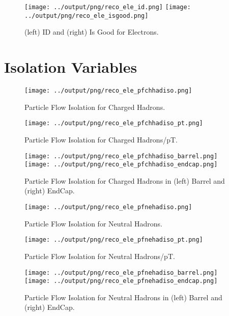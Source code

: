\documentclass[11pt]{book}
\begin{document}
\begin{figure}[htb]
\centering
\texttt{[image: ../output/png/reco\_ele\_id.png]}
\texttt{[image: ../output/png/reco\_ele\_isgood.png]}
\caption{(left) ID and (right) Is Good for Electrons.}
\label{fig:reco_ele_id_isgood}
\end{figure}
\clearpage

\section{Isolation Variables}
\begin{figure}[htb]
\centering
\texttt{[image: ../output/png/reco\_ele\_pfchhadiso.png]}
\caption{Particle Flow Isolation for Charged Hadrons.}
\label{fig:reco_ele_pfchhadiso}
\end{figure}

\begin{figure}[htb]
\centering
\texttt{[image: ../output/png/reco\_ele\_pfchhadiso\_pt.png]}
\caption{Particle Flow Isolation for Charged Hadrons/pT.}
\label{fig:reco_ele_pfchhadiso_pt}
\end{figure}

\begin{figure}[ht]
\centering
\texttt{[image: ../output/png/reco\_ele\_pfchhadiso\_barrel.png]}
\texttt{[image: ../output/png/reco\_ele\_pfchhadiso\_endcap.png]}
\caption{Particle Flow Isolation for Charged Hadrons in (left) Barrel and (right) EndCap.}
\label{fig:reco_ele_pfchhadiso_regions}
\end{figure}

\begin{figure}[ht]
\centering
\texttt{[image: ../output/png/reco\_ele\_pfnehadiso.png]}
\caption{Particle Flow Isolation for Neutral Hadrons.}
\label{fig:reco_ele_pfnehadiso}
\end{figure}

\begin{figure}[htb]
\centering
\texttt{[image: ../output/png/reco\_ele\_pfnehadiso\_pt.png]}
\caption{Particle Flow Isolation for Neutral Hadrons/pT.}
\label{fig:reco_ele_pfnehadiso_pt}
\end{figure}


\begin{figure}[ht]
\centering
\texttt{[image: ../output/png/reco\_ele\_pfnehadiso\_barrel.png]}
\texttt{[image: ../output/png/reco\_ele\_pfnehadiso\_endcap.png]}
\caption{Particle Flow Isolation for Neutral Hadrons in (left) Barrel and (right) EndCap.}
\label{fig:reco_ele_pfnehadiso_regions}
\end{figure}
\end{document}

